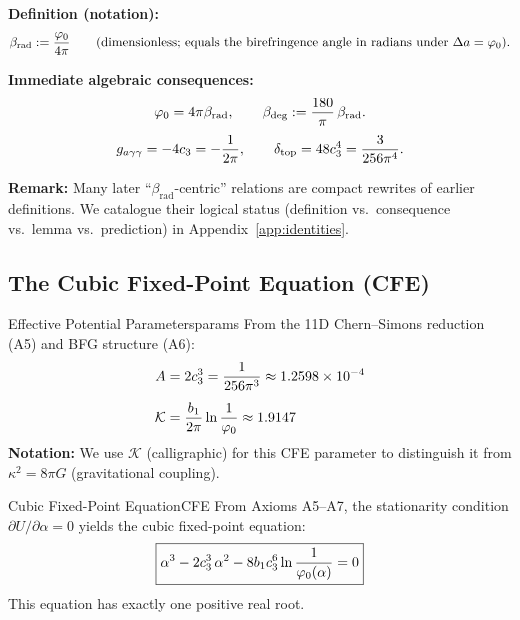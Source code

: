 \begin{tcolorbox}[colback=gray!5, colframe=gray!60, 
    title={\textbf{Dictionary: $\beta_{\text{rad}}$ and Canonical Consequences}}, fonttitle=\bfseries\small]
\textbf{Definition (notation):}
\begin{equation}
    \beta_{\text{rad}} := \frac{\varphi_0}{4\pi}
    \qquad\text{(dimensionless; equals the birefringence angle in radians under $\Delta a=\varphi_0$).}
\end{equation}

\textbf{Immediate algebraic consequences:}
\begin{equation}
    \varphi_0 = 4\pi\beta_{\text{rad}}, 
    \qquad 
    \beta_{\text{deg}} := \frac{180}{\pi}\,\beta_{\text{rad}}.
\end{equation}
\begin{equation}
    g_{a\gamma\gamma} = -4c_3 = -\frac{1}{2\pi},
    \qquad
    \delta_{\mathrm{top}} = 48c_3^4 = \frac{3}{256\pi^4}.
\end{equation}

\textbf{Remark:} Many later ``$\beta_{\text{rad}}$-centric'' relations are compact rewrites of earlier definitions. 
We catalogue their logical status (definition vs.\ consequence vs.\ lemma vs.\ prediction) in Appendix~\ref{app:identities}.
\end{tcolorbox}

\subsection{The Cubic Fixed-Point Equation (CFE)}

\begin{definition}{Effective Potential Parameters}{params}
From the 11D Chern--Simons reduction (A5) and BFG structure (A6):
\begin{align}
    A &= 2c_3^3 = \frac{1}{256\pi^3} \approx 1.2598 \times 10^{-4}\\[0.5em]
    \mathcal{K} &= \frac{b_1}{2\pi}\ln\frac{1}{\varphi_0} \approx 1.9147
\end{align}
\textbf{Notation:} We use $\mathcal{K}$ (calligraphic) for this CFE parameter to 
distinguish it from $\kappa^2 = 8\pi G$ (gravitational coupling).
\end{definition}

\begin{theorem}{Cubic Fixed-Point Equation}{CFE}
From Axioms A5--A7, the stationarity condition $\partial U/\partial\alpha = 0$ 
yields the cubic fixed-point equation:
\begin{equation}
    \boxed{\alpha^3 - 2c_3^3\,\alpha^2 - 8b_1c_3^6\ln\frac{1}{\varphi_0(\alpha)} = 0}
    \label{eq:CFE}
\end{equation}
This equation has exactly one positive real root.
\end{theorem}

